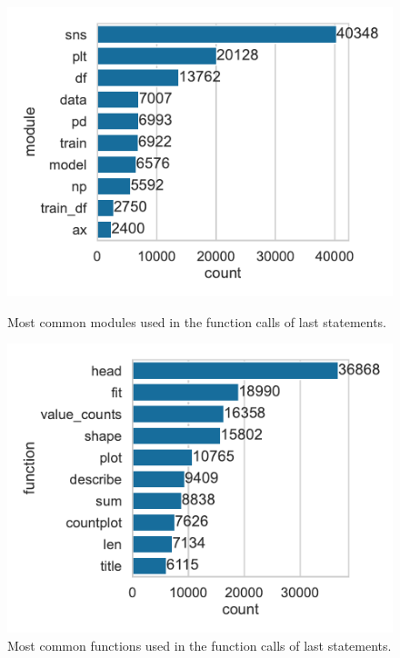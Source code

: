 \begin{figure}
  \centering
  \begin{minipage}{0.49\textwidth}
    \centering
    \includegraphics[width=\linewidth]{common-last-modules.pdf}
    \caption{Most common modules used in the function calls of last statements.}
    \label{fig:common-last-modules}
  \end{minipage}
  \hfill
  \begin{minipage}{0.49\textwidth}
    \centering
    \includegraphics[width=\linewidth]{common-last-functions.pdf}
    \caption{Most common functions used in the function calls of last statements.}
    \label{fig:common-last-functions}
  \end{minipage}
\end{figure}


